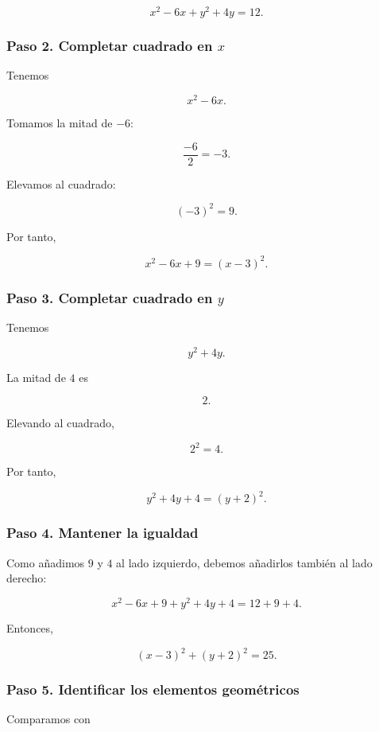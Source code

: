 \documentclass[12pt]{article}
\begin{document}
\[
x^2-6x+y^2+4y=12.
\]

\subsubsection*{Paso 2. Completar cuadrado en \(x\)}

Tenemos

\[
x^2-6x.
\]

Tomamos la mitad de \(-6\):

\[
\frac{-6}{2}=-3.
\]

Elevamos al cuadrado:

\[
(-3)^2=9.
\]

Por tanto,

\[
x^2-6x+9=(x-3)^2.
\]

\subsubsection*{Paso 3. Completar cuadrado en \(y\)}

Tenemos

\[
y^2+4y.
\]

La mitad de \(4\) es

\[
2.
\]

Elevando al cuadrado,

\[
2^2=4.
\]

Por tanto,

\[
y^2+4y+4=(y+2)^2.
\]

\subsubsection*{Paso 4. Mantener la igualdad}

Como añadimos \(9\) y \(4\) al lado izquierdo, debemos añadirlos también
al lado derecho:

\[
x^2-6x+9+y^2+4y+4
=
12+9+4.
\]

Entonces,

\[
(x-3)^2+(y+2)^2=25.
\]

\subsubsection*{Paso 5. Identificar los elementos geométricos}

Comparamos con
\end{document}
